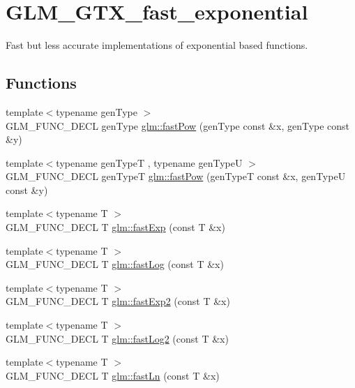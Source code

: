 \hypertarget{group__gtx__fast__exponential}{\section{G\-L\-M\-\_\-\-G\-T\-X\-\_\-fast\-\_\-exponential}
\label{group__gtx__fast__exponential}
}


Fast but less accurate implementations of exponential based functions.  


\subsection*{Functions}
\begin{DoxyCompactItemize}
\item 
{\footnotesize template$<$typename gen\-Type $>$ }\\G\-L\-M\-\_\-\-F\-U\-N\-C\-\_\-\-D\-E\-C\-L gen\-Type \hyperlink{group__gtx__fast__exponential_ga842ec5e981c76f8aae7ae14972795378}{glm\-::fast\-Pow} (gen\-Type const \&x, gen\-Type const \&y)
\item 
{\footnotesize template$<$typename gen\-Type\-T , typename gen\-Type\-U $>$ }\\G\-L\-M\-\_\-\-F\-U\-N\-C\-\_\-\-D\-E\-C\-L gen\-Type\-T \hyperlink{group__gtx__fast__exponential_ga08af6240d87ce7b9851c9095808c1eb8}{glm\-::fast\-Pow} (gen\-Type\-T const \&x, gen\-Type\-U const \&y)
\item 
{\footnotesize template$<$typename T $>$ }\\G\-L\-M\-\_\-\-F\-U\-N\-C\-\_\-\-D\-E\-C\-L T \hyperlink{group__gtx__fast__exponential_ga22a548f1bf42c53898c140e56af16529}{glm\-::fast\-Exp} (const T \&x)
\item 
{\footnotesize template$<$typename T $>$ }\\G\-L\-M\-\_\-\-F\-U\-N\-C\-\_\-\-D\-E\-C\-L T \hyperlink{group__gtx__fast__exponential_ga0130dd03ca124c27dc2094de7ee47e8a}{glm\-::fast\-Log} (const T \&x)
\item 
{\footnotesize template$<$typename T $>$ }\\G\-L\-M\-\_\-\-F\-U\-N\-C\-\_\-\-D\-E\-C\-L T \hyperlink{group__gtx__fast__exponential_ga62216328ac3af1811add813d0804437d}{glm\-::fast\-Exp2} (const T \&x)
\item 
{\footnotesize template$<$typename T $>$ }\\G\-L\-M\-\_\-\-F\-U\-N\-C\-\_\-\-D\-E\-C\-L T \hyperlink{group__gtx__fast__exponential_gadff374a7349142c0ae65f476b9bf4886}{glm\-::fast\-Log2} (const T \&x)
\item 
{\footnotesize template$<$typename T $>$ }\\G\-L\-M\-\_\-\-F\-U\-N\-C\-\_\-\-D\-E\-C\-L T \hyperlink{group__gtx__fast__exponential_ga8f27c4779039f88ae790a9a69be01630}{glm\-::fast\-Ln} (const T \&x)
\end{DoxyCompactItemize}


